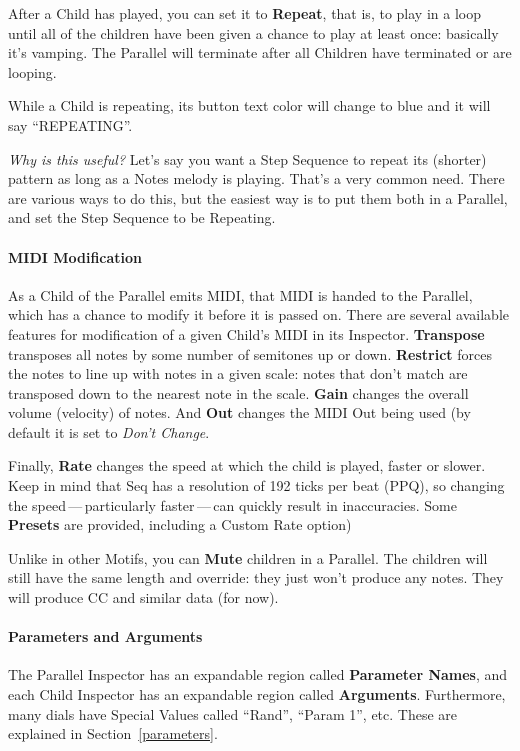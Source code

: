 \documentclass[twoside,10pt]{article}
\begin{document}
After a Child has played, you can set it to {\bf Repeat}, that is, to play in a loop until all of the children have been given a chance to play at least once: basically it's vamping.  The Parallel will terminate after all Children have terminated or are looping.

While a Child is repeating, its button text color will change to blue and it will say ``REPEATING''.

{\it Why is this useful?}  Let's say you want a Step Sequence to repeat its (shorter) pattern as long as a Notes melody is playing.  That's a very common need.  There are various ways to do this, but the easiest way is to put them both in a Parallel, and set the Step Sequence to be Repeating. 

\paragraph{MIDI Modification}

As a Child of the Parallel emits MIDI, that MIDI is handed to the Parallel, which has a chance to modify it before it is passed on.  There are several available features for modification of a given Child's MIDI in its Inspector.  {\bf Transpose} transposes all notes by some number of semitones up or down.  {\bf Restrict} forces the notes to line up with notes in a given scale: notes that don't match are transposed down to the nearest note in the scale.  {\bf Gain} changes the overall volume (velocity) of notes.  And {\bf Out} changes the MIDI Out being used (by default it is set to {\it Don't Change}.

Finally, {\bf Rate} changes the speed at which the child is played, faster or slower.  Keep in mind that Seq has a resolution of 192 ticks per beat (PPQ), so changing the speed\,---\,particularly faster\,---\,can quickly result in inaccuracies.    Some {\bf Presets} are provided, including a Custom Rate option)

Unlike in other Motifs, you can {\bf Mute} children in a Parallel.  The children will still have the same length and override: they just won't produce any notes.  They will produce CC and similar data (for now).

\paragraph{Parameters and Arguments}

The Parallel Inspector has an expandable region called {\bf Parameter Names}, and each Child Inspector has an expandable region called {\bf Arguments}. Furthermore, many dials have Special Values called ``Rand'', ``Param 1'', etc.  These are explained in Section~\ref{parameters}.
\end{document}
